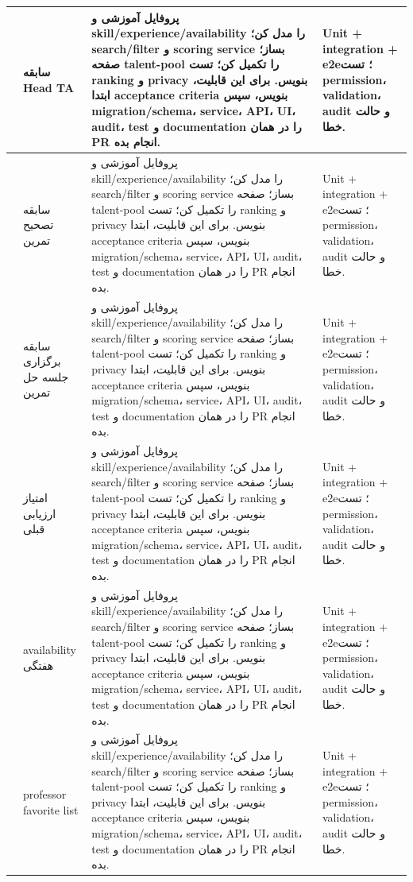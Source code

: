 \documentclass[11pt,a4paper]{article}
\begin{document}
\begin{longtable}{|>{\raggedleft\arraybackslash}p{}|>{\raggedleft\arraybackslash}p{}|>{\raggedleft\arraybackslash}p{}|>{\raggedleft\arraybackslash}p{}|}
81 & سابقه Head TA & پروفایل آموزشی و skill/experience/availability را مدل کن؛ search/filter و scoring service بساز؛ صفحه talent-pool را تکمیل کن؛ تست ranking و privacy بنویس. برای این قابلیت، ابتدا acceptance criteria بنویس، سپس migration/schema، service، API، UI، audit، test و documentation را در همان PR انجام بده. & Unit + integration + e2e؛ تست permission، validation، audit و حالت خطا. \\ \hline
82 & سابقه تصحیح تمرین & پروفایل آموزشی و skill/experience/availability را مدل کن؛ search/filter و scoring service بساز؛ صفحه talent-pool را تکمیل کن؛ تست ranking و privacy بنویس. برای این قابلیت، ابتدا acceptance criteria بنویس، سپس migration/schema، service، API، UI، audit، test و documentation را در همان PR انجام بده. & Unit + integration + e2e؛ تست permission، validation، audit و حالت خطا. \\ \hline
83 & سابقه برگزاری جلسه حل تمرین & پروفایل آموزشی و skill/experience/availability را مدل کن؛ search/filter و scoring service بساز؛ صفحه talent-pool را تکمیل کن؛ تست ranking و privacy بنویس. برای این قابلیت، ابتدا acceptance criteria بنویس، سپس migration/schema، service، API، UI، audit، test و documentation را در همان PR انجام بده. & Unit + integration + e2e؛ تست permission، validation، audit و حالت خطا. \\ \hline
84 & امتیاز ارزیابی قبلی & پروفایل آموزشی و skill/experience/availability را مدل کن؛ search/filter و scoring service بساز؛ صفحه talent-pool را تکمیل کن؛ تست ranking و privacy بنویس. برای این قابلیت، ابتدا acceptance criteria بنویس، سپس migration/schema، service، API، UI، audit، test و documentation را در همان PR انجام بده. & Unit + integration + e2e؛ تست permission، validation، audit و حالت خطا. \\ \hline
85 & availability هفتگی & پروفایل آموزشی و skill/experience/availability را مدل کن؛ search/filter و scoring service بساز؛ صفحه talent-pool را تکمیل کن؛ تست ranking و privacy بنویس. برای این قابلیت، ابتدا acceptance criteria بنویس، سپس migration/schema، service، API، UI، audit، test و documentation را در همان PR انجام بده. & Unit + integration + e2e؛ تست permission، validation، audit و حالت خطا. \\ \hline
86 & professor favorite list & پروفایل آموزشی و skill/experience/availability را مدل کن؛ search/filter و scoring service بساز؛ صفحه talent-pool را تکمیل کن؛ تست ranking و privacy بنویس. برای این قابلیت، ابتدا acceptance criteria بنویس، سپس migration/schema، service، API، UI، audit، test و documentation را در همان PR انجام بده. & Unit + integration + e2e؛ تست permission، validation، audit و حالت خطا. \\ \hline

\end{longtable}
\end{document}
